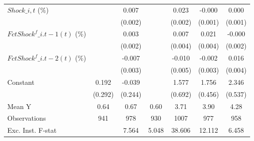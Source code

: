 {\begin{tabular}{l*{6}{c}}
\addlinespace
$ Shock\_{i,t}$ (\%) &                     &       0.007\sym{***}&                     &       0.023\sym{***}&      -0.000         &       0.000         \\
                    &                     &     (0.002)         &                     &     (0.002)         &     (0.001)         &     (0.001)         \\
\addlinespace
$ FctShock^f\_{i.t-1}(t)$ (\%)&                     &       0.003         &                     &       0.007\sym{*}  &       0.021\sym{***}&      -0.000         \\
                    &                     &     (0.002)         &                     &     (0.004)         &     (0.004)         &     (0.002)         \\
\addlinespace
$ FctShock^f\_{i.t-2}(t)$ (\%)&                     &      -0.007\sym{**} &                     &      -0.010\sym{**} &      -0.002         &       0.016\sym{***}\\
                    &                     &     (0.003)         &                     &     (0.005)         &     (0.003)         &     (0.004)         \\
\addlinespace
Constant            &       0.192         &      -0.039         &                     &       1.577\sym{**} &       1.756\sym{***}&       2.346\sym{***}\\
                    &     (0.292)         &     (0.244)         &                     &     (0.692)         &     (0.456)         &     (0.537)         \\
\midrule
Mean Y              &        0.64         &        0.67         &        0.60         &        3.71         &        3.90         &        4.28         \\
Observations        &         941         &         978         &         930         &        1007         &         977         &         958         \\
Exc. Inst. F-stat   &                     &       7.564         &       5.048         &      38.606         &      12.112         &       6.458         \\
\bottomrule
\end{tabular}
}
